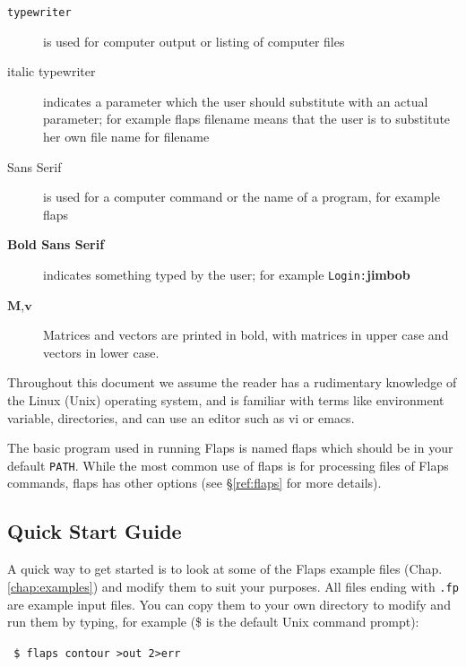 \documentclass[11pt,openany,twoside]{book}
\numberwithin{equation}{section}		%
\newcommand{\Cmd}[1]{{\sf #1}}
\newcommand{\UserIn}[1]{{\small\sf\bf #1}}
\newcommand{\Code}[1]{{\small\tt #1}}
\newcommand{\Subst}[1]{{\small\sf #1}}
\newcommand{\Matrix}[1]{\boldsymbol{#1}}
\newcommand{\Vector}[1]{\boldsymbol{#1}}
\newcommand{\Sectref}[1]{\S\ref{#1}}
\newcommand{\Chapref}[1]{Chap. \ref{#1}}
\begin{document}
{\begin{description}
	\item[\Code{typewriter}]
	is used for computer output or listing of computer files
                
	\item[\Subst{italic typewriter}]
		indicates a parameter which the user should substitute with an
		actual parameter; for example
			\Cmd{flaps} \Subst{filename\/}
     means that the user is to substitute her own file name for
	\Subst{filename\/}
                
	\item[\Cmd{Sans Serif}]
	is used for a computer command or the name of a program,
	for example \Cmd{flaps}
                
	\item[\UserIn{Bold Sans Serif}]
	indicates something typed by the user; for example
	\Code{Login:}\UserIn{jimbob}
                
	\item[$\Matrix{M}$,$\Vector{v}$] 
	Matrices and vectors are printed in bold, with matrices in upper
	case and vectors in lower case.
                
\end{description}}

Throughout this document we assume the reader has a rudimentary
knowledge of the Linux (Unix) operating system, and is familiar with
terms like environment variable, directories, and can
use an editor such as {\sffamily vi} or {\sffamily emacs}.

The basic program used in running Flaps is named \Cmd{flaps}
which should be in your default \Code{PATH}.
While the most common use of \Cmd{flaps} is for processing
files of Flaps commands, \Cmd{flaps} has other options
(see \Sectref{ref:flaps} for more details).

\subsection{Quick Start Guide}
\par
A quick way to get started is to look at some of the
Flaps example files (\Chapref{chap:examples}) and
modify them to suit your purposes. All files ending
with \Code{.fp} are example input files.  You can copy them to
your own directory to modify and run them by typing,
for example (\$ is the default Unix command prompt):
\par
\Code{
\$ flaps contour >out 2>err
}
\end{document}
